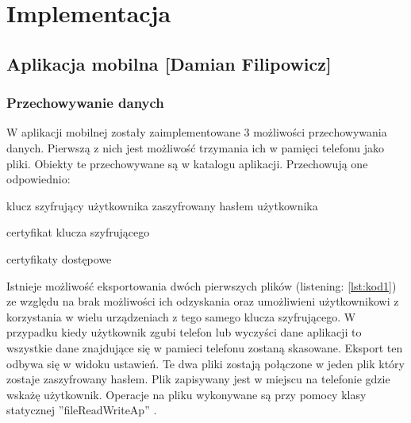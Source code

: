 \newpage\section{Implementacja} \label{sec:implementacja}
\subsection[Aplikacja mobilna]{Aplikacja mobilna [Damian Filipowicz]}
	\subsubsection{Przechowywanie danych}
	W aplikacji mobilnej zostały zaimplementowane 3 możliwości przechowywania danych. Pierwszą z nich jest możliwość trzymania ich w pamięci telefonu jako pliki. Obiekty te przechowywane są w katalogu aplikacji. Przechowują one odpowiednio:
	\begin{itemize*}
	\item	klucz szyfrujący użytkownika zaszyfrowany hasłem użytkownika
	\item certyfikat klucza szyfrującego 
	\item certyfikaty dostępowe
	\end{itemize*}	
	Istnieje możliwość eksportowania dwóch pierwszych plików (listening: \ref{lst:kod1}) ze względu na brak możliwości ich odzyskania oraz umożliwieni użytkownikowi z korzystania w wielu urządzeniach z tego samego klucza szyfrującego. W przypadku kiedy użytkownik zgubi telefon lub  wyczyści dane aplikacji to wszystkie dane znajdujące się w pamieci telefonu zostaną skasowane. Eksport ten odbywa się w widoku ustawień. Te dwa pliki zostają połączone w jeden plik który zostaje zaszyfrowany hasłem. Plik zapisywany jest w miejscu na telefonie gdzie wskażę użytkownik.  Operacje na pliku wykonywane są przy pomocy klasy statycznej ''fileReadWriteAp'' .
	

